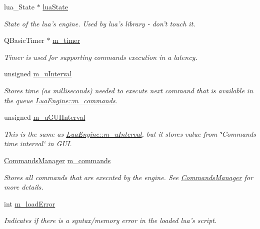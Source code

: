 \begin{DoxyCompactItemize}
\item 
lua\-\_\-\-State $\ast$ \hyperlink{class_lua_engine_af9593e71b3d33a62cbf9e3080771bff9}{lua\-State}
\begin{DoxyCompactList}\small\item\em State of the lua's engine. Used by lua's library -\/ don't touch it. \end{DoxyCompactList}\item 
Q\-Basic\-Timer $\ast$ \hyperlink{class_lua_engine_a367284a1461c5a2d2804c3f9b4d94f14}{m\-\_\-timer}
\begin{DoxyCompactList}\small\item\em Timer is used for supporting commands execution in a latency. \end{DoxyCompactList}\item 
unsigned \hyperlink{class_lua_engine_af25b4a96c17c157ae110afa1dd0866ec}{m\-\_\-u\-Interval}
\begin{DoxyCompactList}\small\item\em Stores time (as milliseconds) needed to execute next command that is available in the queue \hyperlink{class_lua_engine_a86a3f32127e36e1ccce6c5a42a298ad5}{Lua\-Engine\-::m\-\_\-commands}. \end{DoxyCompactList}\item 
unsigned \hyperlink{class_lua_engine_ac7d00771a353cc9afa586a6ec10f5d90}{m\-\_\-u\-G\-U\-I\-Interval}
\begin{DoxyCompactList}\small\item\em This is the same as \hyperlink{class_lua_engine_af25b4a96c17c157ae110afa1dd0866ec}{Lua\-Engine\-::m\-\_\-u\-Interval}, but it stores value from \char`\"{}\-Commands time interval\char`\"{} in G\-U\-I. \end{DoxyCompactList}\item 
\hyperlink{class_commands_manager}{Commands\-Manager} \hyperlink{class_lua_engine_a86a3f32127e36e1ccce6c5a42a298ad5}{m\-\_\-commands}
\begin{DoxyCompactList}\small\item\em Stores all commands that are executed by the engine. See \hyperlink{class_commands_manager}{Commands\-Manager} for more details. \end{DoxyCompactList}\item 
int \hyperlink{class_lua_engine_af8dca74620280060399b5b7dd937af44}{m\-\_\-load\-Error}
\begin{DoxyCompactList}\small\item\em Indicates if there is a syntax/memory error in the loaded lua's script. \end{DoxyCompactList}\item 

\end{DoxyCompactItemize}
